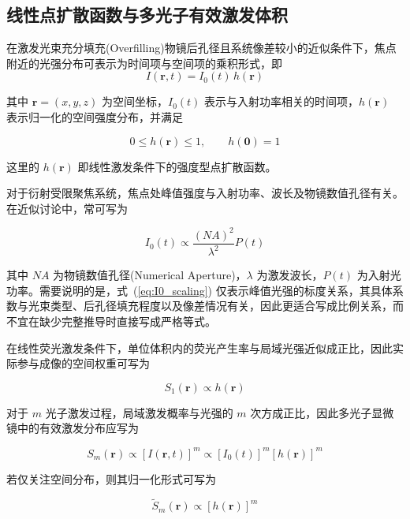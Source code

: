 \subsection{线性点扩散函数与多光子有效激发体积}\label{2.2.1}
在激发光束充分填充(Overfilling)物镜后孔径且系统像差较小的近似条件下，焦点附近的光强分布可表示为时间项与空间项的乘积形式，即
\begin{equation}
  I(\mathbf{r},t)=I_{0}(t)\,h(\mathbf{r})
  \label{eq:psf_separation}
\end{equation}

其中 $\mathbf{r}=(x,y,z)$ 为空间坐标，$I_{0}(t)$ 表示与入射功率相关的时间项，$h(\mathbf{r})$ 表示归一化的空间强度分布，并满足

\begin{equation}
  0\le h(\mathbf{r})\le 1,\qquad h(\mathbf{0})=1
\end{equation}

这里的 $h(\mathbf{r})$ 即线性激发条件下的强度型点扩散函数。

对于衍射受限聚焦系统，焦点处峰值强度与入射功率、波长及物镜数值孔径有关。在近似讨论中，常可写为

\begin{equation}
  I_{0}(t)\propto \frac{(NA)^2}{\lambda^2}P(t)
  \label{eq:I0_scaling}
\end{equation}

其中 $NA$ 为物镜数值孔径(Numerical Aperture)，$\lambda$ 为激发波长，$P(t)$ 为入射光功率。需要说明的是，式~(\ref{eq:I0_scaling}) 仅表示峰值光强的标度关系，其具体系数与光束类型、后孔径填充程度以及像差情况有关，因此更适合写成比例关系，而不宜在缺少完整推导时直接写成严格等式。

在线性荧光激发条件下，单位体积内的荧光产生率与局域光强近似成正比，因此实际参与成像的空间权重可写为

\begin{equation}
  S_{1}(\mathbf{r})\propto h(\mathbf{r})
  \label{eq:linear_psf}
\end{equation}

对于 $m$ 光子激发过程，局域激发概率与光强的 $m$ 次方成正比，因此多光子显微镜中的有效激发分布应写为

\begin{equation}
  S_{m}(\mathbf{r})\propto [I(\mathbf{r},t)]^{m}
  \propto [I_{0}(t)]^{m}[h(\mathbf{r})]^{m}
  \label{eq:multiphoton_psf}
\end{equation}

若仅关注空间分布，则其归一化形式可写为

\begin{equation}
  \widetilde{S}_{m}(\mathbf{r})\propto [h(\mathbf{r})]^{m}
  \label{eq:effective_psf}
\end{equation}

